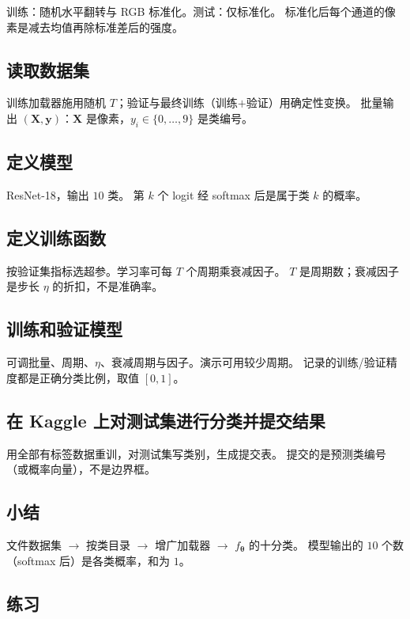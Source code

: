 训练：随机水平翻转与 RGB 标准化。测试：仅标准化。
标准化后每个通道的像素是减去均值再除标准差后的强度。

\subsection{读取数据集}

训练加载器施用随机 $T$；验证与最终训练（训练$+$验证）用确定性变换。
批量输出 $(\bm{X},\bm{y})$：$\bm{X}$ 是像素，$y_i\in\{0,\ldots,9\}$ 是类编号。

\subsection{定义模型}

ResNet-18，输出 $10$ 类。
第 $k$ 个 logit 经 softmax 后是属于类 $k$ 的概率。

\subsection{定义训练函数}

按验证集指标选超参。学习率可每 $T$ 个周期乘衰减因子。
$T$ 是周期数；衰减因子是步长 $\eta$ 的折扣，不是准确率。

\subsection{训练和验证模型}

可调批量、周期、$\eta$、衰减周期与因子。演示可用较少周期。
记录的训练/验证精度都是正确分类比例，取值 $[0,1]$。

\subsection{在 Kaggle 上对测试集进行分类并提交结果}

用全部有标签数据重训，对测试集写类别，生成提交表。
提交的是预测类编号（或概率向量），不是边界框。

\subsection{小结}

文件数据集 $\to$ 按类目录 $\to$ 增广加载器 $\to$ $f_{\bm{\theta}}$ 的十分类。
模型输出的 $10$ 个数（softmax 后）是各类概率，和为 $1$。

\subsection{练习}

